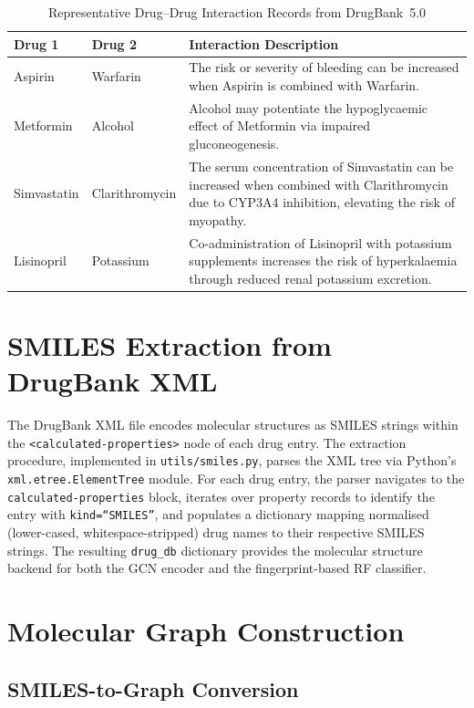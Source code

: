 \documentclass[12pt,a4paper,oneside]{report}
\begin{document}
\begin{table}[htbp]
\centering
\caption{Representative Drug--Drug Interaction Records from DrugBank~5.0}
\label{tab:ddi_examples}
\begin{tabular}{p{2.4cm} p{2.4cm} p{8.2cm}}
\toprule
\textbf{Drug 1} & \textbf{Drug 2} & \textbf{Interaction Description} \\
\midrule
Aspirin & Warfarin & The risk or severity of bleeding can be increased when
Aspirin is combined with Warfarin. \\[0.5ex]
Metformin & Alcohol & Alcohol may potentiate the hypoglycaemic effect of Metformin
via impaired gluconeogenesis. \\[0.5ex]
Simvastatin & Clarithromycin & The serum concentration of Simvastatin can be increased
when combined with Clarithromycin due to CYP3A4 inhibition, elevating the risk of
myopathy. \\[0.5ex]
Lisinopril & Potassium & Co-administration of Lisinopril with potassium supplements
increases the risk of hyperkalaemia through reduced renal potassium excretion. \\
\bottomrule
\end{tabular}
\end{table}

\section{SMILES Extraction from DrugBank XML}

The DrugBank XML file encodes molecular structures as SMILES strings within the
\texttt{<calculated-properties>} node of each drug entry. The extraction procedure,
implemented in \texttt{utils/smiles.py}, parses the XML tree via Python's
\texttt{xml.etree.ElementTree} module. For each drug entry, the parser navigates to the
\texttt{calculated-properties} block, iterates over property records to identify the entry
with \texttt{kind=``SMILES''}, and populates a dictionary mapping normalised (lower-cased,
whitespace-stripped) drug names to their respective SMILES strings. The resulting
\texttt{drug\_db} dictionary provides the molecular structure backend for both the GCN
encoder and the fingerprint-based RF classifier.

\section{Molecular Graph Construction}

\subsection{SMILES-to-Graph Conversion}
\end{document}

